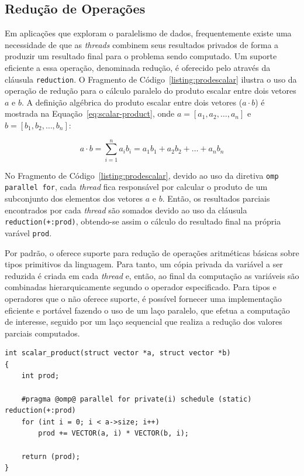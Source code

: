 \documentclass{SBCbookchapter}
\begin{document}
	\subsection{Redução de Operações}
	\label{subsection: reducao de operacoes}

		Em aplicações que exploram o paralelismo de dados,
		frequentemente existe uma necessidade de que as \textit{threads}
		combinem seus resultados privados de forma a produzir um
		resultado final para o problema sendo computado. Um suporte
		eficiente a essa operação, denominada redução, é oferecido pelo
		\openmp através da cláusula \texttt{reduction}. O Fragmento de
		Código~\ref{listing:prodescalar} ilustra o uso da operação de
		redução para o cálculo paralelo do produto escalar entre dois
		vetores $a$ e $b$. A definição algébrica do produto escalar entre dois
		vetores ($a \cdot b$) é mostrada na Equação~\ref{eq:scalar-product},
		onde $a=[a_1, a_2, \dots, a_n]$ e $b=[b_1, b_2, \dots, b_n]$:
		
			\begin{equation}
			a \cdot b = \sum_{i=1}^{n} a_i b_i = a_1 b_1 + a_2 b_2 + \dots + a_n b_n
			\label{eq:scalar-product}
			\end{equation}		
		
		No Fragmento de Código~\ref{listing:prodescalar}, devido ao uso
		da diretiva \texttt{omp parallel for}, cada \textit{thread} fica responsável por
		calcular o produto de um subconjunto dos elementos dos vetores $a$ e $b$.
		Então, os resultados parciais encontrados por cada \textit{thread} são
		somados devido ao uso da cláusula \texttt{reduction(+:prod)}, obtendo-se
		assim o cálculo do resultado final na própria varável \texttt{prod}.

		Por padrão, o \openmp oferece suporte  para redução de operações
		aritméticas básicas sobre tipos primitivos da linguagem. Para
		tanto, um cópia privada da variável a ser reduzida é criada em
		cada \textit{thread} e, então, ao final da computação as
		variáveis são combinadas hierarquicamente segundo o operador
		especificado. Para tipos e operadores que o \openmp não oferece
		suporte, é possível fornecer uma implementação eficiente e
		portável fazendo o uso de um laço paralelo, que efetua a
		computação de interesse, seguido por um laço sequencial que
		realiza a redução dos valores parciais computados.

\begin{lstlisting}[float,floatplacement=b,frame=single,caption=Produto escalar.,
label=listing:prodescalar]
int scalar_product(struct vector *a, struct vector *b)
{
	int prod;

	#pragma @omp@ parallel for private(i) schedule (static) reduction(+:prod)
	for (int i = 0; i < a->size; i++)
		prod += VECTOR(a, i) * VECTOR(b, i);
	
	return (prod);
}
\end{lstlisting}
\end{document}
